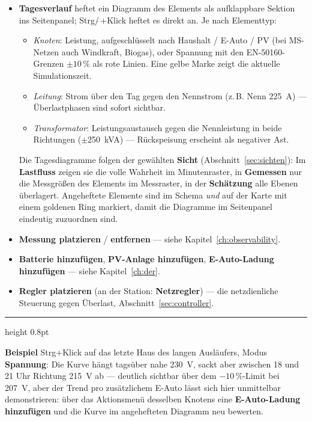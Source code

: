 \documentclass[11pt,a4paper,parskip=half]{scrreprt}
\newcommand{\ui}[1]{\textsf{\bfseries #1}}          %
\newenvironment{beispiel}[1][Beispiel]
  {\par\medskip
   {\color{bsp}\hrule height 0.8pt}\nopagebreak\smallskip
   \noindent\textbf{\textsf{\textcolor{bsp}{#1}}}\quad\ignorespaces}
  {\par\nopagebreak\smallskip{\color{bsp}\hrule height 0.8pt}\par\medskip}
\begin{document}
\begin{itemize}[nosep]
  \item \ui{Tagesverlauf} heftet ein Diagramm des Elements als
    aufklappbare Sektion ins Seitenpanel;
    Strg/$\hat{}$\,+Klick heftet es direkt an. Je nach Elementtyp:
    \begin{itemize}[nosep]
      \item \emph{Knoten}: Leistung, aufgeschlüsselt nach
        Haushalt / E-Auto / PV (bei MS-Netzen auch Windkraft,
        Biogas), oder Spannung mit den EN-50160-Grenzen
        $\pm 10\,\%$ als rote Linien. Eine gelbe Marke zeigt die
        aktuelle Simulationszeit.
      \item \emph{Leitung}: Strom über den Tag gegen den Nennstrom
        (z.\,B. \glqq Nenn 225~A\grqq) --- Überlastphasen sind sofort
        sichtbar.
      \item \emph{Transformator}: Leistungsaustausch gegen die
        Nennleistung in beide Richtungen ($\pm$250~kVA) ---
        Rückspeisung erscheint als negativer Ast.
    \end{itemize}
    Die Tagesdiagramme folgen der gewählten \ui{Sicht}
    (Abschnitt~\ref{sec:sichten}): Im \ui{Lastfluss} zeigen sie die
    volle Wahrheit im Minutenraster, in \ui{Gemessen} nur die
    Messgrößen des Elements im Messraster, in der \ui{Schätzung}
    alle Ebenen überlagert. Angeheftete Elemente sind im Schema
    \emph{und} auf der Karte mit einem goldenen Ring markiert, damit
    die Diagramme im Seitenpanel eindeutig zuzuordnen sind.
  \item \ui{Messung platzieren} / \ui{entfernen} --- siehe
    Kapitel~\ref{ch:observability}.
  \item \ui{Batterie hinzufügen}, \ui{PV-Anlage hinzufügen},
    \ui{E-Auto-Ladung hinzufügen} --- siehe Kapitel~\ref{ch:der}.
  \item \ui{Regler platzieren} (an der Station: \ui{Netzregler}) ---
    die netzdienliche Steuerung gegen Überlast,
    Abschnitt~\ref{sec:controller}.
\end{itemize}

\begin{beispiel}
Strg+Klick auf das letzte Haus des langen Ausläufers, Modus
\ui{Spannung}: Die Kurve hängt tagsüber nahe 230~V, sackt aber
zwischen 18 und 21 Uhr Richtung 215~V ab --- deutlich sichtbar über
dem $-10\,\%$-Limit bei 207~V, aber der Trend pro zusätzlichem
E-Auto lässt sich hier unmittelbar demonstrieren: über das
Aktionsmenü desselben Knotens eine \ui{E-Auto-Ladung hinzufügen}
und die Kurve im angehefteten Diagramm neu bewerten.
\end{beispiel}
\end{document}
